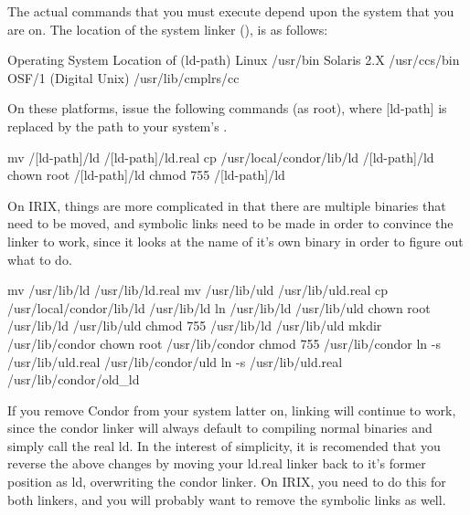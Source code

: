 The actual commands that you must execute depend upon the system that you
are on.  The location of the system linker (), is as follows:

	Operating System              Location of  (ld-path)
	Linux                         /usr/bin
	Solaris 2.X		      /usr/ccs/bin
	OSF/1 (Digital Unix)          /usr/lib/cmplrs/cc

On these platforms, issue the following commands (as root), where [ld-path] is
replaced by the path to your system's .

	mv /[ld-path]/ld /[ld-path]/ld.real
        cp /usr/local/condor/lib/ld /[ld-path]/ld
        chown root /[ld-path]/ld
        chmod 755 /[ld-path]/ld

On IRIX, things are more complicated in that there are multiple
 binaries that need to be moved, and symbolic links need to
be made in order to convince the linker to work, since it looks at the
name of it's own binary in order to figure out what to do.

	mv /usr/lib/ld /usr/lib/ld.real
        mv /usr/lib/uld /usr/lib/uld.real
        cp /usr/local/condor/lib/ld /usr/lib/ld
        ln /usr/lib/ld /usr/lib/uld
        chown root /usr/lib/ld /usr/lib/uld
        chmod 755 /usr/lib/ld /usr/lib/uld
        mkdir /usr/lib/condor
        chown root /usr/lib/condor
        chmod 755 /usr/lib/condor
        ln -s /usr/lib/uld.real /usr/lib/condor/uld
        ln -s /usr/lib/uld.real /usr/lib/condor/old_ld

If you remove Condor from your system latter on, linking will continue
to work, since the condor linker will always default to compiling
normal binaries and simply call the real ld.  In the interest of
simplicity, it is recomended that you reverse the above changes by
moving your ld.real linker back to it's former position as ld,
overwriting the condor linker.  On IRIX, you need to do this for both
linkers, and you will probably want to remove the symbolic links as
well.

